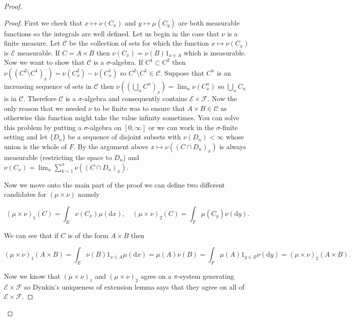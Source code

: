 \documentclass[
]{book}
\theoremstyle{definition}
\theoremstyle{definition}
\theoremstyle{definition}
\theoremstyle{definition}
\theoremstyle{remark}
\begin{document}
\begin{proof}
\begin{proof}
First we check that \(x \mapsto \nu(C_x)\) and \(y \mapsto \mu(C_y)\) are both measurable functions so the integrals are well defined. Let us begin in the case that \(\nu\) is a finite measure. Let \(\mathcal{C}\) be the collection of sets for which the function \(x \mapsto \nu(C_x)\) is \(\mathcal{E}\) measurable. If \(C = A \times B\) then \(\nu(C_x) = \nu(B)1_{x \in A}\) which is measurable. Now we want to show that \(\mathcal{C}\) is a \(\sigma\)-algebra. If \(C^1 \subset C^2\) then \(\nu((C^2 \setminus C^1)_x) = \nu(C^2_x) - \nu(C^1_x)\) so \(C^2 \setminus C^1 \in \mathcal{C}\). Suppose that \(C^n\) is an increasing sequence of sets in \(\mathcal{C}\) then \(\nu\left( \left(\bigcup_n C^n\right)_x\right) = \lim_n \nu \left( C^n_x\right)\) so \(\bigcup_n C_n\) is in \(\mathcal{C}\). Therefore \(\mathcal{C}\) is a \(\sigma\)-algebra and consequently contains \(\mathcal{E} \times \mathcal{F}\). Now the only reason that we needed \(\nu\) to be finite was to ensure that \(A \times B \in \mathcal{C}\) as otherwise this function might take the value infinity sometimes. You can solve this problem by putting a \(\sigma\)-algebra on \([0,\infty]\) or we can work in the \(\sigma\)-finite setting and let \(\{D_n\}\) be a sequence of disjoint subsets with \(\nu(D_n)< \infty\) whose union is the whole of \(F\). By the argument above \(x \mapsto \nu((C\cap D_n)_x)\) is always measurable (restricting the space to \(D_n\)) and \(\nu(C_x) = \lim_n \sum_{k=1}^n \nu((C \cap D_n)_x)\).

Now we move onto the main part of the proof we can define two different candidates for \((\mu \times \nu)\) namely

\[ (\mu \times \nu)_1(C) = \int_E \nu(C_x) \mu(\mathrm{d}x), \quad (\mu \times \nu)_2(C) = \int_F \mu(C_y) \nu(\mathrm{d}y). \]

We can see that if \(C\) is of the form \(A \times B\) then

\[ (\mu \times \nu)_1(A \times B) = \int_E \nu(B)1_{x \in A} \mu(\mathrm{d}x) = \mu(A) \nu(B) = \int_F \mu(A)1_{y \in B} \nu(\mathrm{d}y) = (\mu \times \nu)_2 (A \times B). \]

Now we know that \((\mu \times \nu)_1\) and \((\mu \times \nu)_2\) agree on a \(\pi\)-system generating \(\mathcal{E} \times \mathcal{F}\) so Dynkin's uniqueness of extension lemma says that they agree on all of \(\mathcal{E} \times \mathcal{F}\).


\end{proof}
\end{proof}
\end{document}
